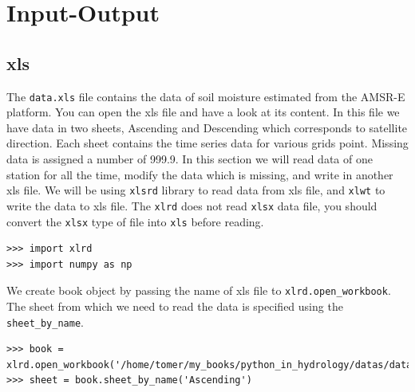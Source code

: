\documentclass[10pt]{book}
\begin{document}
{\chapter{Input-Output}
\section{xls}
The \verb"data.xls" file contains the data of soil moisture estimated from the AMSR-E platform. You can open the xls file and have a look at its content. In this file we have data in two sheets, Ascending and Descending which corresponds to satellite direction. Each sheet contains the time series data for various grids point. Missing data is assigned a number of 999.9. In this section we will read data of one station for all the time, modify the data which is missing, and write in another xls file. We will be using \verb"xlsrd" library to read data from xls file, and \verb"xlwt" to write the data to xls file. The \verb"xlrd" does not read \verb"xlsx" data file, you should convert the \verb"xlsx" type of file into \verb"xls" before reading.

\beforeverb \begin{verbatim}
>>> import xlrd
>>> import numpy as np
\end{verbatim} \afterverb

We create book object by passing the name of xls file to \verb"xlrd.open_workbook". The sheet from which we need to read the data is specified using the \verb"sheet_by_name".  
\beforeverb \begin{verbatim}
>>> book = xlrd.open_workbook('/home/tomer/my_books/python_in_hydrology/datas/data.xls')
>>> sheet = book.sheet_by_name('Ascending')
\end{verbatim} \afterverb

}
\end{document}
